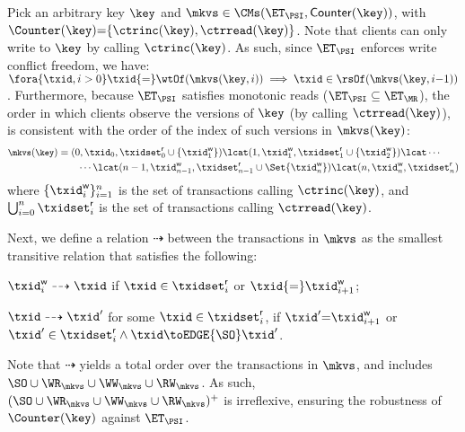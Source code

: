 Pick an arbitrary key $\key$ and $\mkvs \in \CMs(\ET_{\PSI}, \mathsf{Counter}(\key))$, 
with $\Counter(\key) {=} \{\ctrinc(\key), \ctrread(\key)\}$. 
Note that clients can only write to $\key$ by calling $\ctrinc(\key)$.
As such, since $\ET_{\PSI}$ enforces write conflict freedom, we have: 
$\fora{\txid, i > 0} \txid {=} \wtOf(\mkvs(\key, i)) \implies \txid \in \rsOf(\mkvs(\key, i{-}1))$. 
Furthermore, because $\ET_{\PSI}$ satisfies monotonic reads ($\ET_{\PSI} \subseteq \ET_{\MR}$),
the order in which clients observe the versions of $\key$ (by calling $\ctrread(\key)$), 
is consistent with the order of the index of such versions in $\mkvs(\key)$:
%
%
{%
\begin{align*}
    \small
	\mkvs(\key) & = (0, \txid_{0}, \txidset^{\mathsf{r}}_{0} \cup \{\txid^{\mathsf{w}}_1\}) 
	\lcat (1, \txid^{\mathsf{w}}_{1}, \txidset^{\mathsf{r}}_{1} \cup \{\txid^{\mathsf{w}}_2\}) 
	\lcat \cdots  \\
	& \qquad \cdots \lcat (n-1, \txid^{\mathsf{w}}_{n-1}, \txidset^{\mathsf{r}}_{n-1} \cup \Set{\txid^{\mathsf{w}}_n})
	\lcat (n, \txid^{\mathsf{w}}_n, \txidset^{\mathsf{r}}_{n})
\end{align*}%
}%
%
\noindent where $\{\txid^{\mathsf{w}}_{i}\}_{i=1}^{n}$ is the set of transactions calling $\ctrinc(\key)$, 
and $\bigcup_{i=0}^{n} \txidset^{\mathsf{r}}_{i}$ is the set of transactions calling $\ctrread(\key)$. 

Next, we define a relation $\dashrightarrow$ between
the transactions in $\mkvs$ as the smallest transitive relation that 
satisfies the following: 
\begin{enumerate*}
	\item $\txid^{\mathsf{w}}_{i} 
	\dashrightarrow \txid$ if $\txid \in \txidset^{\mathsf{r}}_{i}$ 
	or $\txid {=} \txid^{\mathsf{w}}_{i+1}$; 
	\item $\txid \dashrightarrow \txid'$ 
	for some $\txid \in \txidset^{\mathsf{r}}_{i}$,
	if $\txid' {=} \txid^{\mathsf{w}}_{i+1}$
	or $\txid' \in \txidset^{\mathsf{r}}_{i} \land \txid \toEDGE{\SO} \txid'$. 
\end{enumerate*}
%
Note that $\dashrightarrow$ yields a total order over the transactions in $\mkvs$, 
and includes $\SO \cup \WR_{\mkvs} \cup \WW_{\mkvs} \cup \RW_{\mkvs}$. 
As such, $(\SO \cup \WR_{\mkvs} \cup \WW_{\mkvs} \cup \RW_{\mkvs})^+$ is irreflexive, 
ensuring the robustness of $\Counter(\key)$ against $\ET_{\PSI}$.


